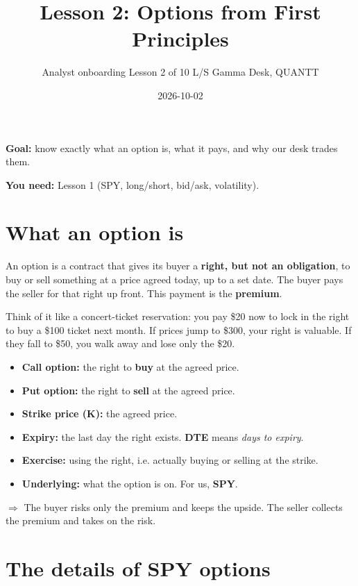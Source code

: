 \documentclass{article}
\title{Lesson 2: Options from First Principles}
\author{Analyst onboarding \textperiodcentered{} Lesson 2 of 10 \textperiodcentered{} L/S Gamma Desk, QUANTT}
\date{2026-10-02}
\begin{document}
\maketitle

\textbf{Goal:} know exactly what an option is, what it pays, and why our desk trades them.

\textbf{You need:} Lesson 1 (SPY, long/\allowbreak{}short, bid/\allowbreak{}ask, volatility).

\section{What an option is}

An option is a contract that gives its buyer a \textbf{right, but not an obligation}, to buy or sell something at a price agreed today, up to a set date. The buyer pays the seller for that right up front. This payment is the \textbf{premium}.

Think of it like a concert-ticket reservation: you pay \$20 now to lock in the right to buy a \$100 ticket next month. If prices jump to \$300, your right is valuable. If they fall to \$50, you walk away and lose only the \$20.

\begin{itemize}

\item \textbf{Call option:} the right to \textbf{buy} at the agreed price.

\item \textbf{Put option:} the right to \textbf{sell} at the agreed price.

\item \textbf{Strike price (K):} the agreed price.

\item \textbf{Expiry:} the last day the right exists. \textbf{DTE} means \emph{days to expiry}.

\item \textbf{Exercise:} using the right, i.e. actually buying or selling at the strike.

\item \textbf{Underlying:} what the option is on. For us, \textbf{SPY}.

\end{itemize}

\textbf{$\Rightarrow$} The buyer risks only the premium and keeps the upside. The seller collects the premium and takes on the risk.

\section{The details of SPY options}
\end{document}
